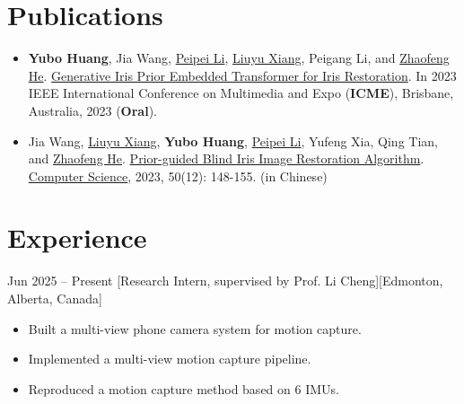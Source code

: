 \documentclass{chicv}
\begin{document}
\section{Publications}

\begin{itemize}
  \item \textbf{Yubo Huang}, Jia Wang, \href{https://teacher.bupt.edu.cn/lipeipei/en/index/241243/list/index.htm}{Peipei Li}, \href{https://teacher.bupt.edu.cn/xiangliuyu/en/lwcg/255396/list/index.htm}{Liuyu Xiang}, Peigang Li, and \href{https://teacher.bupt.edu.cn/hezhaofeng/en/lwcg/206617/list/index.htm}{Zhaofeng He}. \href{https://scholar.google.ca/scholar?q=Generative+Iris+Prior+Embedded+Transformer+for+Iris+Restoration.&hl=en&as_sdt=0&as_vis=1&oi=scholart}{Generative Iris Prior Embedded Transformer for Iris Restoration}. In 2023 IEEE International Conference on Multimedia and Expo (\textbf{ICME}), Brisbane, Australia, 2023 (\textbf{Oral}).
  \item Jia Wang, \href{https://teacher.bupt.edu.cn/xiangliuyu/en/lwcg/255396/list/index.htm}{Liuyu Xiang}, \textbf{Yubo Huang}, \href{https://teacher.bupt.edu.cn/lipeipei/en/index/241243/list/index.htm}{Peipei Li}, Yufeng Xia, Qing Tian, and \href{https://teacher.bupt.edu.cn/hezhaofeng/en/lwcg/206617/list/index.htm}{Zhaofeng He}. \href{https://www.jsjkx.com/EN/Y2023/V50/I12/148}{Prior-guided Blind Iris Image Restoration Algorithm}. \href{https://www.jsjkx.com/EN/1002-137X/home.shtml}{Computer Science}, 2023, 50(12): 148-155. (in Chinese)
\end{itemize}

\section{Experience}

  {Jun 2025 -- Present}
  [Research Intern, supervised by Prof. Li Cheng][Edmonton, Alberta, Canada]
  \begin{itemize}
    \item Built a multi-view phone camera system for motion capture.
    \item Implemented a multi-view motion capture pipeline.
    \item Reproduced a motion capture method based on 6 IMUs.
  \end{itemize}
\end{document}
